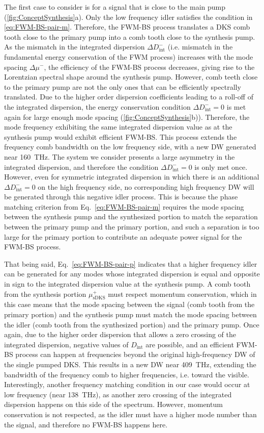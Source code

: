 \documentclass[reprint,superscriptaddress, amsmath,amssymb,pra, aps,floatfix,longbibliography]{revtex4-1}
\begin{document}
The first case to consider is for a signal that is close to the main pump (\cref{fig:ConceptSynthesis}a). Only the low frequency idler satisfies the condition in \cref{eq:FWM-BS-pair-m}. Therefore, the FWM-BS process translates a DKS comb tooth close to the primary pump into a comb tooth close to the synthesis pump. As the mismatch in the integrated dispersion $\Delta D_\mathrm{int}^{-}$ (i.e. mismatch in the fundamental energy conservation of the FWM process) increases with the mode spacing $\Delta \mu^{-}$, the efficiency of the FWM-BS process decreases, giving rise to the Lorentzian spectral shape around the synthesis pump. However, comb teeth close to the primary pump are not the only ones that can be efficiently spectrally translated. Due to the higher order dispersion coefficients leading to a roll-off of the integrated dispersion, the energy conservation condition $\Delta D_\mathrm{int}^{-} = 0$ is met again for large enough mode spacing (\cref{fig:ConceptSynthesis}b)). Therefore, the mode frequency exhibiting the same integrated dispersion value as at the synthesis pump would exhibit efficient FWM-BS. This process extends the frequency comb bandwidth on the low frequency side, with a new DW generated near 160~THz. The system we consider presents a large asymmetry in the integrated dispersion, and therefore the condition $\Delta D_\mathrm{int}^{-} = 0$ is only met once. However, even for symmetric integrated dispersion in which there is an additional $\Delta D_\mathrm{int}^{-} = 0$ on the high frequency side, no corresponding high frequency DW will be generated through this negative idler process. This is because the phase matching criterion from Eq.~\ref{eq:FWM-BS-pair-m} requires the mode spacing between the synthesis pump and the synthesized portion to match the separation between the primary pump and the primary portion, and such a separation is too large for the primary portion to contribute an adequate power signal for the FWM-BS process.

That being said, Eq.~\ref{eq:FWM-BS-pair-p} indicates that a higher frequency idler can be generated for any modes whose integrated dispersion is equal and opposite in sign to the integrated dispersion value at the synthesis pump. A comb tooth from the synthesis portion $\mu_\mathrm{sDKS}^{+}$ must respect momentum conservation, which in this case means that the mode spacing between the signal (comb tooth from the primary portion) and the synthesis pump must match the mode spacing between the idler (comb tooth from the synthesized portion) and the primary pump. Once again, due to the higher order dispersion that allows a zero crossing of the integrated dispersion, negative values of $D_\mathrm{int}$ are possible, and an efficient FWM-BS process can happen at frequencies beyond the original high-frequency DW of the single pumped DKS. This results in a new DW near 409~THz, extending the bandwidth of the frequency comb to higher frequencies, i.e. toward the visible. Interestingly, another frequency matching condition in our case would occur at low frequency (near 138~THz), as another zero crossing of the integrated dispersion happens on this side of the spectrum. However, momentum conservation is not respected, as the idler must have a higher mode number than the signal, and therefore no FWM-BS happens here.
\end{document}
